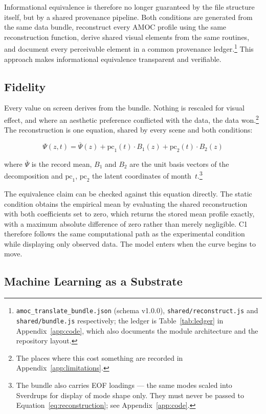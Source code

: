 Informational equivalence is therefore no longer guaranteed by the file structure itself, but by a shared provenance pipeline. Both conditions are generated from the same data bundle, reconstruct every AMOC profile using the same reconstruction function, derive shared visual elements from the same routines, and document every perceivable element in a common provenance ledger.\footnote{\texttt{amoc\_translate\_bundle.json} (schema v1.0.0), \texttt{shared/reconstruct.js} and \texttt{shared/bundle.js} respectively; the ledger is Table~\ref{tab:ledger} in Appendix~\ref{app:code}, which also documents the module architecture and the repository layout.} This approach makes informational equivalence transparent and verifiable. 
\subsection{Fidelity}
\label{subsec:fidelity}
 
Every value on screen derives from the bundle. Nothing is rescaled for visual effect, and where an aesthetic preference conflicted with the data, the data won.\footnote{The places where this cost something are recorded in Appendix~\ref{app:limitations}.} The reconstruction is one equation, shared by every scene and both conditions:
 
\begin{equation}
\label{eq:reconstruction}
\Psi(z, t) = \overline{\Psi}(z) + \mathrm{pc}_1(t) \cdot B_1(z) + \mathrm{pc}_2(t) \cdot B_2(z)
\end{equation}
 
where $\overline{\Psi}$ is the record mean, $B_1$ and $B_2$ are the unit basis vectors of the decomposition and $\mathrm{pc}_1$, $\mathrm{pc}_2$ the latent coordinates of month~$t$.\footnote{The bundle also carries EOF loadings --- the same modes scaled into Sverdrups for display of mode shape only. They must never be passed to Equation~\ref{eq:reconstruction}; see Appendix~\ref{app:code}.}
 
The equivalence claim can be checked against this equation directly. The static condition obtains the empirical mean by evaluating the shared reconstruction with both coefficients set to zero, which returns the stored mean profile exactly, with a maximum absolute difference of zero rather than merely negligible. C1 therefore follows the same computational path as the experimental condition while displaying only observed data. The model enters when the curve begins to move.
 
\subsection{Machine Learning as a Substrate}
\label{subsec:ml-role}
 
